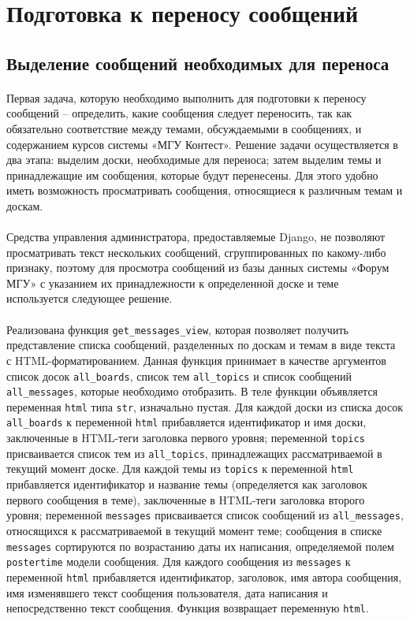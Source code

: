 \documentclass[12pt, a4paper, oneside]{article}
\begin{document}
\section{Подготовка к переносу сообщений}
\subsection{Выделение сообщений необходимых для переноса}
\paragraph{}
Первая задача, которую необходимо выполнить для подготовки к переносу сообщений – определить, какие сообщения следует переносить, так как обязательно соответствие между темами, обсуждаемыми в сообщениях, и содержанием курсов системы «МГУ Контест». Решение задачи осуществляется в два этапа: выделим доски, необходимые для переноса; затем выделим темы и принадлежащие им сообщения, которые будут перенесены. Для этого удобно иметь возможность просматривать сообщения, относящиеся к различным темам и доскам.
\paragraph{}
Средства управления администратора, предоставляемые Django, не позволяют просматривать текст нескольких сообщений, сгруппированных по какому-либо признаку, поэтому для просмотра сообщений из базы данных системы «Форум МГУ» с указанием их принадлежности к определенной доске и теме используется следующее решение.
\paragraph{}
Реализована функция \texttt{get\_messages\_view}, которая позволяет получить представление списка сообщений, разделенных по доскам и темам в виде текста с HTML-форматированием. Данная функция принимает в качестве аргументов список досок \texttt{all\_boards}, список тем \texttt{all\_topics} и список сообщений \texttt{all\_messages}, которые необходимо отобразить. В теле функции объявляется переменная \texttt{html} типа \texttt{str}, изначально пустая. Для каждой доски из списка досок \texttt{all\_boards} к переменной \texttt{html} прибавляется идентификатор и имя доски, заключенные в HTML-теги заголовка первого уровня; переменной \texttt{topics} присваивается список тем из \texttt{all\_topics}, принадлежащих рассматриваемой в текущий момент доске. Для каждой темы из \texttt{topics} к переменной \texttt{html} прибавляется идентификатор и название темы (определяется как заголовок первого сообщения в теме), заключенные в HTML-теги заголовка второго уровня; переменной \texttt{messages} присваивается список сообщений из \texttt{all\_messages}, относящихся к рассматриваемой в текущий момент теме; сообщения в списке \texttt{messages} сортируются по возрастанию даты их написания, определяемой полем \texttt{postertime} модели сообщения. Для каждого сообщения из \texttt{messages} к переменной \texttt{html} прибавляется идентификатор, заголовок, имя автора сообщения, имя изменявшего текст сообщения пользователя, дата написания и непосредственно текст сообщения. Функция возвращает переменную \texttt{html}.
\end{document}
